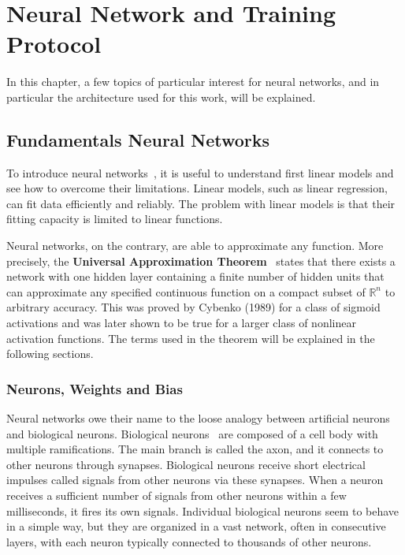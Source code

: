 \chapter{Neural Network and Training Protocol}
\label{ch:ann}

In this chapter, a few topics of particular interest for neural networks, and in particular the architecture used for this work, will be explained.

\section{Fundamentals Neural Networks}
\label{sec:ann_fundamentals}

To introduce neural networks~\cite{Goodfellow-et-al-2016}, it is useful to understand first linear models and see how to overcome their limitations. Linear models, such as linear regression, can fit data efficiently and reliably. The problem with linear models is that their fitting capacity is limited to linear functions.

Neural networks, on the contrary, are able to approximate any function. More precisely, the \textbf{Universal Approximation Theorem}~\cite{prince2023understanding} states that there exists a network with one hidden layer containing a finite number of hidden units that can approximate any specified continuous function on a compact subset of $\mathbb{R}^n$ to arbitrary accuracy. This was proved by Cybenko (1989) for a class of sigmoid activations and was later shown to be true for a larger class of nonlinear activation functions.
The terms used in the theorem will be explained in the following sections.

\subsection{Neurons, Weights and Bias}
\label{subsec:neurons}

Neural networks owe their name to the loose analogy between artificial neurons and biological neurons.
Biological neurons~\cite{geron2022hands} are composed of a cell body with multiple ramifications. The main branch is called the axon, and it connects to other neurons through synapses. Biological neurons receive short electrical impulses called signals from other neurons via these synapses. When a neuron receives a sufficient number of signals from other neurons within a few milliseconds, it fires its own signals. Individual biological neurons seem to behave in a simple way, but they are organized in a vast network, often in consecutive layers, with each neuron typically connected to thousands of other neurons.

